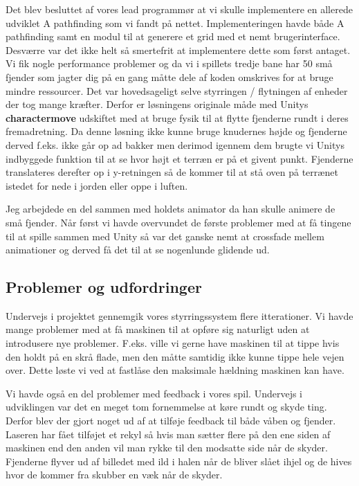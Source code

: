 Det blev besluttet af vores lead programmør at vi skulle implementere en allerede udviklet A\* pathfinding som vi fandt på nettet. Implementeringen havde både A\* pathfinding samt en modul til at generere et grid med et nemt brugerinterface. Desværre var det ikke helt så smertefrit at implementere dette som først antaget. Vi fik nogle performance problemer og da vi i spillets tredje bane har 50 små fjender som jagter dig på en gang måtte dele af koden omskrives for at bruge mindre ressourcer. Det var hovedsageligt selve styrringen / flytningen af enheder der tog mange kræfter. Derfor er løsningens originale måde med Unitys \textbf{charactermove} udskiftet med at bruge fysik til at flytte fjenderne rundt i deres fremadretning. Da denne løsning ikke kunne bruge knudernes højde og fjenderne derved f.eks. ikke går op ad bakker men derimod igennem dem brugte vi Unitys indbyggede funktion til at se hvor højt et terræn er på et givent punkt. Fjenderne translateres derefter op i y-retningen så de kommer til at stå oven på terrænet istedet for nede i jorden eller oppe i luften.

Jeg arbejdede en del sammen med holdets animator da han skulle animere de små fjender. Når først vi havde overvundet de første problemer med at få tingene til at spille sammen med Unity så var det ganske nemt at crossfade mellem animationer og derved få det til at se nogenlunde glidende ud.  

\subsection{Problemer og udfordringer}

Undervejs i projektet gennemgik vores styrringssystem flere itterationer. Vi havde mange problemer med at få maskinen til at opføre sig naturligt uden at introdusere nye problemer. F.eks. ville vi gerne have maskinen til at tippe hvis den holdt på en skrå flade, men den måtte samtidig ikke kunne tippe hele vejen over. Dette løste vi ved at fastlåse den maksimale hældning maskinen kan have.

Vi havde også en del problemer med feedback i vores spil. Undervejs i udviklingen var det en meget tom fornemmelse at køre rundt og skyde ting. Derfor blev der gjort noget ud af at tilføje feedback til både våben og fjender. Laseren har fået tilføjet et rekyl så hvis man sætter flere på den ene siden af maskinen end den anden vil man rykke til den modsatte side når de skyder. Fjenderne flyver ud af billedet med ild i halen når de bliver slået ihjel og de hives hvor de kommer fra skubber en væk når de skyder.

